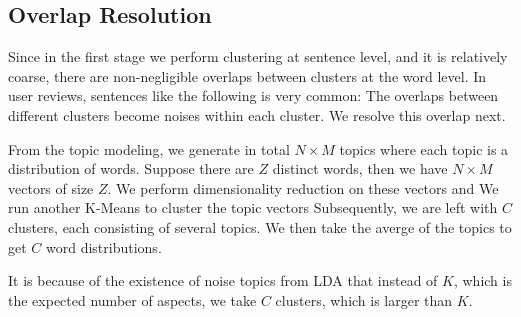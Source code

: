 \subsection{Overlap Resolution}
Since in the first stage we perform clustering at sentence level, and it is relatively coarse,
there are non-negligible overlaps between clusters at the word level. 
In user reviews, sentences like the following is very common:
The overlaps between different clusters become
noises within each cluster. We resolve this overlap next.


From the topic modeling, we generate in total $N\times M$ 
topics where each topic is a distribution of words. 
Suppose there are $Z$ distinct words, then we have 
$N\times M$ vectors of size $Z$.
We perform dimensionality reduction on these vectors and
We run another K-Means to cluster the topic vectors 
Subsequently, we are left with $C$ clusters, 
each consisting of several topics. We then take 
the averge of the topics to get $C$ word distributions.

It is because of the existence of noise topics from 
LDA that instead of $K$, which is the expected number of 
aspects, we take $C$ clusters, which is larger than $K$. 
